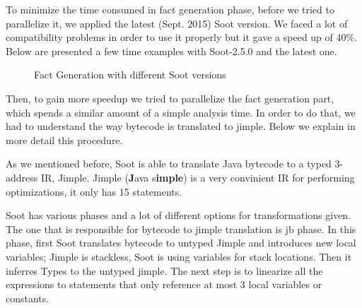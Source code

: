 \documentclass{dithesis}
\begin{document}
    	To minimize the time consumed in fact generation phase, before we tried to parallelize it, we applied the latest (Sept. 2015) Soot version. We faced a lot of compatibility problems in order to use it properly but it gave a speed up of 40\%. Below are presented a few time examples with Soot-2.5.0 and the latest one.

		\begin{figure}[H]
			\centering
{}
			\caption{Fact Generation with different Soot versions}
		\end{figure}

    	Then, to gain more speedup we tried to parallelize the fact generation part, which spends a similar amount of a simple analysis time. In order to do that, we had to understand the way bytecode is translated to jimple. Below we explain in more detail this procedure.

        As we mentioned before, Soot is able to translate Java bytecode to a typed 3-address IR, Jimple. Jimple (\textbf{J}ava s\textbf{imple}) is a very convinient IR for performing optimizations, it only has 15 statements.

        Soot has various phases and a lot of different options for transformations given. The one that is responsible for bytecode to jimple translation is jb phase. In this phase, first Soot translates bytecode to untyped Jimple and introduces new local variables; Jimple is stackless, Soot is using variables for stack locations. Then it inferres Types to the untyped jimple. The next step is to linearize all the expressions to statements that only reference at most 3 local variables or constants.
\end{document}
